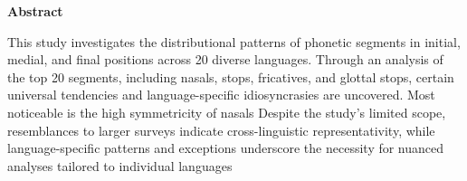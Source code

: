 \thispagestyle{plain}
\begin{center}
    \Large
    \textbf{Abstract}
\end{center}
This study investigates the distributional patterns of phonetic segments in initial, medial, and final positions across 20 diverse languages. 
Through an analysis of the top 20 segments, including nasals, stops, fricatives, and glottal stops, certain universal tendencies and language-specific idiosyncrasies are uncovered.
Most noticeable is the high symmetricity of nasals 
Despite the study's limited scope, resemblances to larger surveys indicate cross-linguistic representativity, while language-specific patterns and exceptions underscore the necessity for nuanced analyses tailored to individual languages